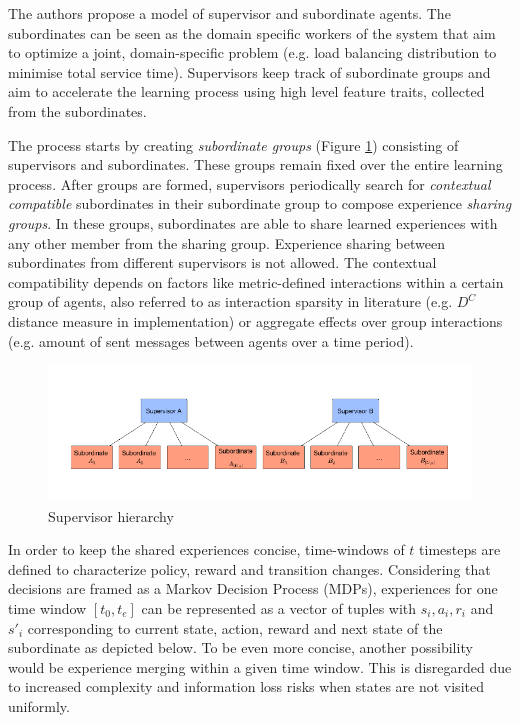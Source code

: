\documentclass[letterpaper]{article}
\begin{document}
The authors propose a model of supervisor and subordinate agents. The subordinates can be seen as the domain specific workers of the system that aim to optimize a joint, domain-specific problem (e.g. load balancing distribution to minimise total service time). Supervisors keep track of subordinate groups and aim to accelerate the learning process using high level feature traits, collected from the subordinates.

The process starts by creating \textit{subordinate groups} (Figure \ref{fig:subordinate}) consisting of supervisors and subordinates. These groups remain fixed over the entire learning process. After groups are formed, supervisors periodically search for \textit{contextual compatible} subordinates in their subordinate group to compose experience \textit{sharing groups}. In these groups, subordinates are able to share learned experiences with any other member from the sharing group. Experience sharing between subordinates from different supervisors is not allowed. The contextual compatibility depends on factors like metric-defined interactions within a certain group of agents, also referred to as interaction sparsity in literature (e.g. $D^C$ distance measure in implementation) or aggregate effects over group interactions (e.g. amount of sent messages between agents over a time period).
\begin{figure}[ht]
 \begin{center}
  \includegraphics[width=\linewidth]{figures/subordinates}
  \caption{Supervisor hierarchy \citep{garant2015accelerating}}
  \label{fig:subordinate}
 \end{center}
\end{figure}
In order to keep the shared experiences concise, time-windows of $t$ timesteps are defined to characterize policy, reward and transition changes. Considering that decisions are framed as a Markov Decision Process (MDPs), experiences for one time window $[t_{0}, t_{e}]$ can be represented as a vector of tuples with $s_i, a_i, r_i$ and $s'_i$ corresponding to current state, action, reward and next state of the subordinate as depicted below. To be even more concise, another possibility would be experience merging within a given time window. This is disregarded due to increased complexity and information loss risks when states are not visited uniformly.
\end{document}
